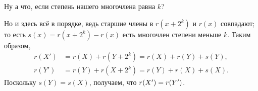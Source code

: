 Ну а что, если степень нашего многочлена равна $k$?

Но и здесь всё в порядке, ведь старшие члены в $r(x+2^k)$ и $r(x)$ совпадают;
то есть $s(x)=r(x+2^k)-r(x)$ есть многочлен степени меньше $k$.
Таким образом,
\begin{align*}
r(X')&=r(X)+r(Y+2^k)=r(X)+r(Y)+s(Y),
\\
r(Y')&=r(Y)+r(X+2^k)=r(Y)+r(X)+s(X).
\end{align*}
Поскольку $s(Y)=s(X)$, получаем, что $r(X')\z=r(Y')$.


